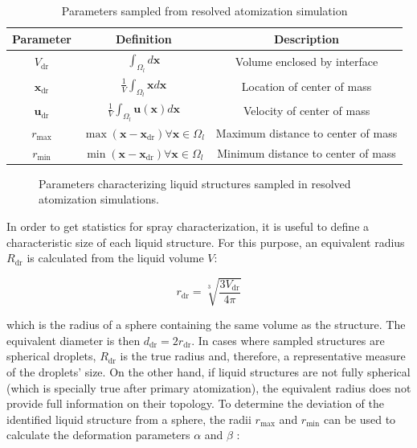 \begin{table}[!h]
\centering
\caption{Parameters sampled from resolved atomization simulation}
\begin{tabular}{|c|c|c|}
\hline
Parameter & Definition & Description \\
\hline
\hline
$V_\mathrm{dr}$ & $\displaystyle \int_{\Omega_l} d \textbf{x}$ & Volume enclosed by interface  \\
\hline
$\textbf{x}_\mathrm{dr}$ & $\displaystyle \frac{1}{V} \int_{\Omega_l} \boldsymbol{x} d \textbf{x}$ &   Location of center of mass \\
\hline
$\textbf{u}_\mathrm{dr}$ & $\displaystyle \frac{1}{V} \int_{\Omega_l} \textbf{u} \left( \boldsymbol{x} \right) d \textbf{x}$ & Velocity of center of mass  \\
\hline
$r_\mathrm{max}$ & $\displaystyle \max \left( \textbf{x} - \textbf{x}_\mathrm{dr}  \right) \forall \textbf{x} \in \Omega_l$ & Maximum distance to center of mass \\
\hline
$r_\mathrm{min}$ & $\displaystyle \min \left( \textbf{x} - \textbf{x}_\mathrm{dr}  \right) \forall \textbf{x} \in \Omega_l$ & Minimum distance to center of mass \\
\hline
\end{tabular}
\label{tab:sampling_parameters}
\end{table}

\begin{figure}[h!]	
	\centering
	\caption{Parameters characterizing liquid structures sampled in resolved atomization simulations. }
	\label{fig:droplet_sampling_parameters}
\end{figure}

In order to get statistics for spray characterization, it is useful to define a characteristic size of each liquid structure. For this purpose, an equivalent radius $R_\mathrm{dr}$ is calculated from the liquid volume $V$:

\begin{equation}
r_\mathrm{dr} = \sqrt[3]{\frac{3 V_\mathrm{dr}}{4 \pi}}
\end{equation}

which is the radius of a sphere containing the same volume as the structure. The equivalent diameter is then $d_\mathrm{dr} = 2 r_\mathrm{dr}$. In cases where sampled structures are spherical droplets, $R_\mathrm{dr}$ is the true radius and, therefore, a representative measure of the droplets' size. On the other hand, if liquid structures are not fully spherical (which is specially true after primary atomization), the equivalent radius does not provide full information on their topology. To determine the deviation of the identified liquid structure from a sphere, the radii $r_\mathrm{max}$ and $r_\mathrm{min}$ can be used to calculate the deformation parameters $\alpha$ and $\beta$ :

